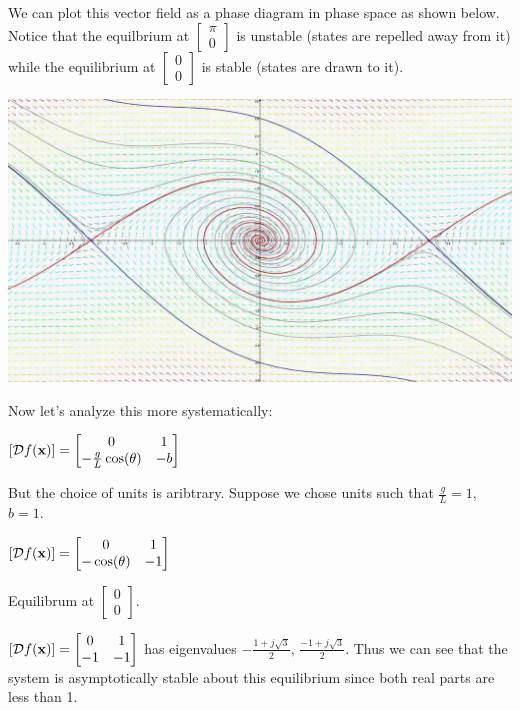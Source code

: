 \documentclass[11pt]{article}
\begin{document}
  We can plot this vector field as a phase diagram in phase space as shown below. Notice that the equilbrium at
  \(\begin{bmatrix} \pi \\ 0 \end{bmatrix}\) is unstable (states are repelled away from it) while the equilibrium
  at \(\begin{bmatrix} 0 \\ 0 \end{bmatrix}\) is stable (states are drawn to it).

  \includegraphics[scale=0.23]{./graphics/pendulum_phase.jpg}

  Now let's analyze this more systematically:

  \({\left[ \mathcal{D} f(\mathbf{x}) \right]} =
  \begin{bmatrix}
    0 & 1 \\
    -\frac{g}{L}\cos(\theta) & -b
  \end{bmatrix}\)

  But the choice of units is aribtrary. Suppose we chose units such that \(\frac{g}{L} = 1\), \(b = 1\).

  \({\left[ \mathcal{D} f(\mathbf{x}) \right]} =
  \begin{bmatrix}
    0 & 1 \\
    -\cos(\theta) & -1
  \end{bmatrix}\)

  \vspace{12pt}

  Equilibrum at \(\begin{bmatrix} 0 \\ 0 \end{bmatrix}\).

  \({\left[ \mathcal{D} f(\mathbf{x}) \right]} =
  \begin{bmatrix}
    0 & 1 \\
    -1 & -1
  \end{bmatrix}\) has eigenvalues \(-\frac{1 + j\sqrt{3}}{2},\, \frac{-1 + j\sqrt{3}}{2}\). Thus we can see that
  the system is asymptotically stable about this equilibrium since both real parts are less than 1.
\end{document}
